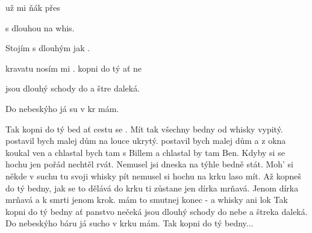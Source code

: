 
\zs
{} už mi  ňák  přes 

 s dlouhou  na   whis.

Stojím s dlouhým  jak  .

 kravatu  nosím mi   .    
\ks
\zr
{} kopni do tý  ať  ne

jsou dlouhý schody do  a štre daleká. 

Do nebeskýho  já su v kr mám.

Tak kopni do tý bed ať  cestu se .
\kr
\zs
Mít tak všechny bedny od whisky vypitý.
postavil bych malej dům na louce ukrytý.
postavil bych malej dům a z okna koukal ven
a chlastal bych tam s Billem a chlastal by tam Ben.
\ks
\zr  \kr
\zs
Kdyby si se hochu jen pořád nechtěl rvát.
Nemusel jsi dneska na týhle bedně stát.
Moh' si někde v suchu tu svoji whisky pít
nemusel si hochu na krku laso mít.
\ks
\zr  \kr
\zs
Až kopneš do tý bedny, jak se to dělává
do krku ti zůstane jen dírka mrňavá.
Jenom dírka mrňavá a k smrti jenom krok.
mám to smutnej konec - a whisky ani lok
\ks
\zr
Tak kopni do tý bedny ať panstvo nečeká
jsou dlouhý schody do nebe a štreka daleká.
Do nebeskýho báru já sucho v krku mám.
Tak kopni do tý bedny...
\kr

\kp






















